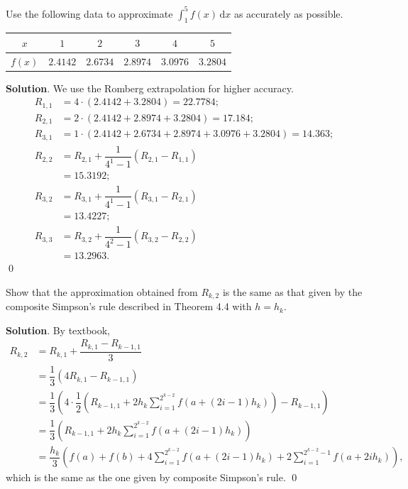 \documentclass[11pt]{article}
\theoremstyle{break}
\newcommand{\ddi}{\text{$\,$d}}
\numberwithin{equation}{theorem}
\begin{document}
\newpage
\begin{problem}\label{problem 11} %
    Use the following data to approximate $\displaystyle\int_1^5 f(x)\ddi x$ as accurately as possible.
    \begin{center}
        \begin{tabular}{c|c|c|c|c|c}
            $x$ & $1$ & $2$ & $3$ & $4$ & $5$ \\
            \hline
            $f(x)$ & $2.4142$ & $2.6734$ & $2.8974$ & $3.0976$ & $3.2804$
        \end{tabular}
    \end{center}
\end{problem}
\textbf{Solution}. We use the Romberg extrapolation for higher accuracy. \begin{align*}
    R_{1,1}&=4\cdot\left(2.4142+3.2804\right)=22.7784;\\
    R_{2,1}&=2\cdot\left(2.4142+2.8974+3.2804\right)=17.184;\\
    R_{3,1}&=1\cdot\left(2.4142+2.6734+2.8974+3.0976+3.2804\right)=14.363;\\
    R_{2,2}&=R_{2,1}+\dfrac{1}{4^1-1}\left(R_{2,1}-R_{1,1}\right)\\
    &=15.3192;\\
    R_{3,2}&=R_{3,1}+\dfrac{1}{4^1-1}\left(R_{3,1}-R_{2,1}\right)\\
    &=13.4227;\\
    R_{3,3}&=R_{3,2}+\dfrac{1}{4^2-1}\left(R_{3,2}-R_{2,2}\right)\\
    &=13.2963.
\end{align*} \qed


\newpage
\begin{problem}\label{problem 12} %
    Show that the approximation obtained from $R_{k,2}$ is the same as that given by the composite Simpson's rule described in Theorem 4.4 with $h=h_k$.
\end{problem}
\textbf{Solution}. By textbook,
\begin{align*}
    R_{k, 2} &= R_{k, 1} + \dfrac{R_{k, 1} - R_{k-1, 1}}{3}\\
    &= \dfrac{1}{3}(4R_{k, 1} - R_{k-1, 1})\\
    &= \dfrac{1}{3}\left(4\cdot \dfrac{1}{2}\left(R_{k-1, 1} + 2h_k\displaystyle\sum_{i=1}^{2^{k-2}} f(a+(2i-1)h_k)\right) - R_{k-1, 1}\right)\\
    &= \dfrac{1}{3}\left(R_{k-1, 1} + 2h_k\displaystyle\sum_{i=1}^{2^{k-2}} f(a+(2i-1)h_k)\right)\\
    &= \dfrac{h_k}{3}\left(f(a) + f(b) + 4\displaystyle\sum_{i=1}^{2^{k-2}} f(a+(2i-1)h_k) + 2\displaystyle\sum_{i=1}^{2^{k-2}-1} f(a+2ih_k)\right),
\end{align*}
which is the same as the one given by composite Simpson's rule. \qed
\end{document}
